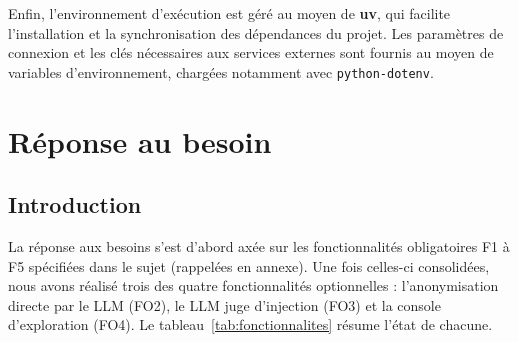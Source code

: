 \documentclass[12pt,a4paper]{article}
\begin{document}
Enfin, l'environnement d'exécution est géré au moyen de \textbf{uv}, qui facilite l'installation et la synchronisation des dépendances du projet. Les paramètres de connexion et les clés nécessaires aux services externes sont fournis au moyen de variables d'environnement, chargées notamment avec \texttt{python-dotenv}.



\section{Réponse au besoin}

\subsection{Introduction}

La réponse aux besoins s’est d'abord axée sur les fonctionnalités obligatoires F1 à F5 spécifiées dans le sujet (rappelées en annexe). Une fois celles-ci consolidées, nous avons réalisé trois des quatre fonctionnalités optionnelles : l'anonymisation directe par le LLM (FO2), le LLM juge d'injection (FO3) et la console d'exploration (FO4). Le tableau~\ref{tab:fonctionnalites} résume l'état de chacune.
\end{document}
